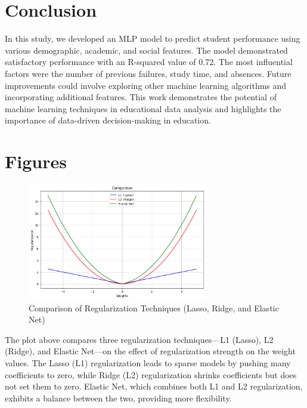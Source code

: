 \documentclass[a4paper,12pt]{article}
\begin{document}
\section{Conclusion}
In this study, we developed an MLP model to predict student performance using various demographic, academic, and social features. The model demonstrated satisfactory performance with an R-squared value of 0.72. The most influential factors were the number of previous failures, study time, and absences. Future improvements could involve exploring other machine learning algorithms and incorporating additional features. This work demonstrates the potential of machine learning techniques in educational data analysis and highlights the importance of data-driven decision-making in education.

\section{Figures}
\begin{figure}[h]
    \centering
    \includegraphics[width=0.7\textwidth]{output.png}
    \caption{Comparison of Regularization Techniques (Lasso, Ridge, and Elastic Net)}
    \label{fig:reg_comparison}
\end{figure}
The plot above compares three regularization techniques—L1 (Lasso), L2 (Ridge), and Elastic Net—on the effect of regularization strength on the weight values. The Lasso (L1) regularization leads to sparse models by pushing many coefficients to zero, while Ridge (L2) regularization shrinks coefficients but does not set them to zero. Elastic Net, which combines both L1 and L2 regularization, exhibits a balance between the two, providing more flexibility.
\end{document}
